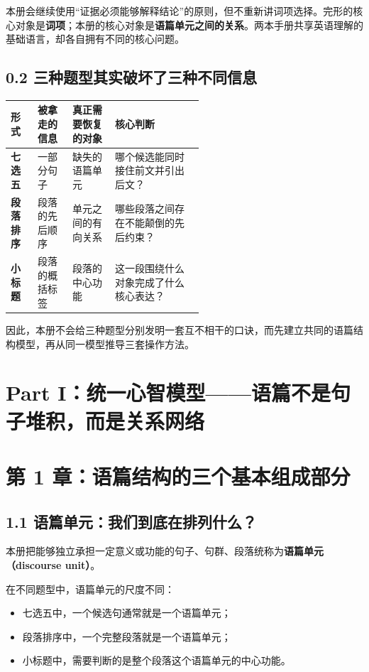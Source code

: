 \documentclass[11pt,a4paper]{ctexart}
\newcommand{\kw}[1]{\textbf{#1}}
\newcommand{\term}[2]{\textbf{#1（#2）}}
\begin{document}
\begin{bridge}[与完形专题的关系]
本册会继续使用“证据必须能够解释结论”的原则，但不重新讲词项选择。完形的核心对象是\kw{词项}；本册的核心对象是\kw{语篇单元之间的关系}。两本手册共享英语理解的基础语言，却各自拥有不同的核心问题。
\end{bridge}

\subsection{0.2 三种题型其实破坏了三种不同信息}
\begin{center}
\small
\begin{tabularx}{\linewidth}{>{\bfseries}p{0.14\linewidth} p{0.18\linewidth} p{0.22\linewidth} X}
\toprule
形式 & 被拿走的信息 & 真正需要恢复的对象 & 核心判断 \\
\midrule
七选五 & 一部分句子 & 缺失的语篇单元 & 哪个候选能同时接住前文并引出后文？ \\
段落排序 & 段落的先后顺序 & 单元之间的有向关系 & 哪些段落之间存在不能颠倒的先后约束？ \\
小标题 & 段落的概括标签 & 段落的中心功能 & 这一段围绕什么对象完成了什么核心表达？ \\
\bottomrule
\end{tabularx}
\end{center}

因此，本册不会给三种题型分别发明一套互不相干的口诀，而先建立共同的语篇结构模型，再从同一模型推导三套操作方法。

\newpage
\section{Part I：统一心智模型——语篇不是句子堆积，而是关系网络}

\section{第 1 章：语篇结构的三个基本组成部分}

\subsection{1.1 语篇单元：我们到底在排列什么？}
本册把能够独立承担一定意义或功能的句子、句群、段落统称为\term{语篇单元}{discourse unit}。

在不同题型中，语篇单元的尺度不同：
\begin{itemize}
  \item 七选五中，一个候选句通常就是一个语篇单元；
  \item 段落排序中，一个完整段落就是一个语篇单元；
  \item 小标题中，需要判断的是整个段落这个语篇单元的中心功能。
\end{itemize}
\end{document}
